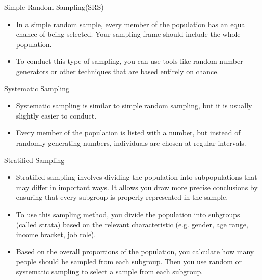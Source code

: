 \begin{frame}[t]{Simple Random Sampling(SRS)}
	\begin{itemize}
		\item In a simple random sample, every member of the population has an 
		equal chance of being selected. Your sampling frame should include the 
		whole population.
		\item To conduct this type of sampling, you can use tools like random 
		number generators or other techniques that are based entirely on chance.
	\end{itemize}
\end{frame}
\begin{frame}[t]{Systematic Sampling}
	\begin{itemize}
		\item Systematic sampling is similar to simple random sampling, but it 
		is usually slightly easier to conduct.
		\item Every member of the population is listed with a number, but 
		instead of randomly generating numbers, individuals are chosen at 
		regular intervals.
	\end{itemize}
\end{frame}

\begin{frame}[t]{ Stratified Sampling}
	\begin{itemize}
		\item Stratified sampling involves dividing the population into 
		subpopulations that may differ in important ways. It allows you draw 
		more precise conclusions by ensuring that every subgroup is properly 
		represented in the sample.
		\item To use this sampling method, you divide the population into 
		subgroups (called strata) based on the relevant characteristic (e.g. 
		gender, age range, income bracket, job role).
		\item Based on the overall proportions of the population, you calculate 
		how many people should be sampled from each subgroup. Then you use 
		random or systematic sampling to select a sample from each subgroup.
	\end{itemize}
\end{frame}

